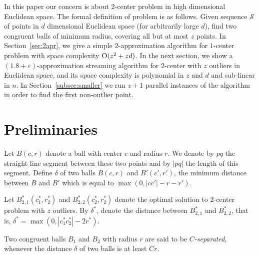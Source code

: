 \documentclass[envcountsame]{cls/cccg15}
\newcommand{\cO}{\ensuremath{{\rm O}}}
\newcommand{\card}[1]{\left|{#1}\right|}
\newcommand{\eps}{\varepsilon}
\begin{document}
In this paper our concern is about $2$-center problem in high dimensional Euclidean space.
The formal definition of problem is as follows. Given sequence $\mathcal{S}$ of points in $d$ dimensional Euclidean space (for arbitrarily large $d$), find two congruent balls of minimum radius, covering all but at most $z$ points. In Section~\ref{sec:2apr}, we give a simple $2$-approximation algorithm for $1$-center problem with space complexity $\cO(z^2 + zd)$. In the next section, we show a $(1.8 + \eps)$-approximation streaming algorithm for $2$-center with $z$ outliers in Euclidean space, and its space complexity is polynomial in $z$ and $d$ and sub-linear in $n$. In Section~\ref{subsec:smaller} we run $z + 1$ parallel instances of the algorithm in order to find the first non-outlier point.





\section{Preliminaries}
\label{sec:pre}
Let $B(c,r)$ denote a ball with center $c$ and radius $r$. We denote by $pq$ the straight line segment between these two points and by $\card{pq}$ the length of this segment. 
Define $\delta$ of two balls $B(c,r)$ and $B'(c',r')$, the minimum distance between $B$ and $B'$ which is equal to $\max (0, \card{cc'}-r-r')$.

Let $B_{2,1}^*(c_1^*, r_2^*)$ and $B_{2,2}^*(c_2^*, r_2^*)$ denote the optimal solution to $2$-center problem with $z$ outliers. By $\delta^*$, denote the distance between $B_{2,1}^*$ and $B_{2,2}^*$, that is, $\delta^* = \max (0, \card{c_1^*c_2^*} - 2r^*)$. 

Two congruent balls $B_1$ and $B_2$ with radius $r$ are said to be \emph{$C$-separated}, whenever the distance $\delta$ of two balls is at least $Cr$.

\end{document}
